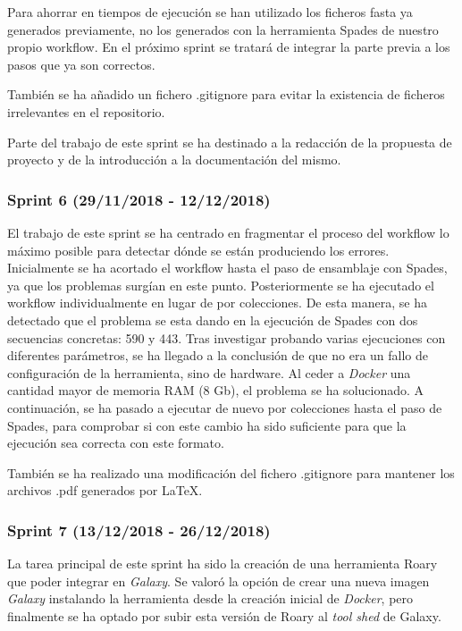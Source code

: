 Para ahorrar en tiempos de ejecución se han utilizado los ficheros fasta ya generados previamente, no los generados con la herramienta Spades de nuestro propio workflow. En el próximo sprint se tratará de integrar la parte previa a los pasos que ya son correctos.

También se ha añadido un fichero .gitignore para evitar la existencia de ficheros irrelevantes en el repositorio.

Parte del trabajo de este sprint se ha destinado a la redacción de la propuesta de proyecto y de la introducción a la documentación del mismo.

\subsubsection{Sprint 6 (29/11/2018 - 12/12/2018)}
El trabajo de este sprint se ha centrado en fragmentar el proceso del workflow lo máximo posible para detectar dónde se están produciendo los errores.
Inicialmente se ha acortado el workflow hasta el paso de ensamblaje con Spades, ya que los problemas surgían en este punto. Posteriormente se ha ejecutado el workflow individualmente en lugar de por colecciones. De esta manera, se ha detectado que el problema se esta dando en la ejecución de Spades con dos secuencias concretas: 590 y 443. Tras investigar probando varias ejecuciones con diferentes parámetros, se ha llegado a la conclusión de que no era un fallo de configuración de la herramienta, sino de hardware. Al ceder a \textit{Docker} una cantidad mayor de memoria RAM (8 Gb), el problema se ha solucionado. 
A continuación, se ha pasado a ejecutar de nuevo por colecciones hasta el paso de Spades, para comprobar si con este cambio ha sido suficiente para que la ejecución sea correcta con este formato. 

También se ha realizado una modificación del fichero .gitignore para mantener los archivos .pdf generados por \LaTeX.

\subsubsection{Sprint 7 (13/12/2018 - 26/12/2018)}
La tarea principal de este sprint ha sido la creación de una herramienta Roary que poder integrar en \textit{Galaxy}. Se valoró la opción de crear una nueva imagen \textit{Galaxy} instalando la herramienta desde la creación inicial de \textit{Docker}, pero finalmente se ha optado por subir esta versión de Roary al \emph{tool shed} de Galaxy.

